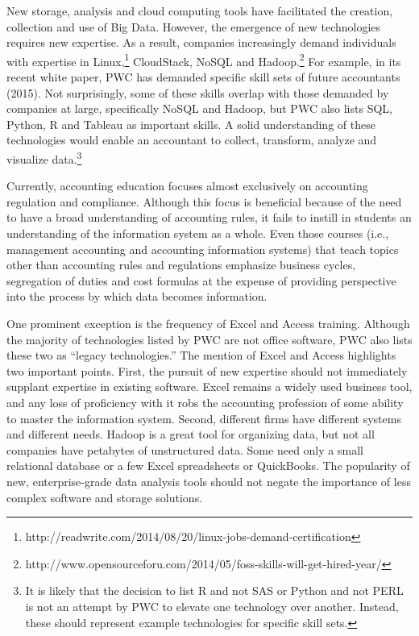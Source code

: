 \documentclass[12pt]{article}
\begin{document}
New storage, analysis and cloud computing tools have facilitated the creation, collection and use of Big Data. However, the emergence of new technologies requires new expertise. As a result, companies increasingly demand individuals with expertise in Linux,\footnote{http://readwrite.com/2014/08/20/linux-jobs-demand-certification} CloudStack, NoSQL and Hadoop.\footnote{http://www.opensourceforu.com/2014/05/foss-skills-will-get-hired-year/} For example, in its recent white paper, PWC has demanded specific skill sets of future accountants (2015). Not surprisingly, some of these skills overlap with those demanded by companies at large, specifically NoSQL and Hadoop, but PWC also lists SQL, Python, R and Tableau as important skills. A solid understanding of these technologies would enable an accountant to collect, transform, analyze and visualize data.\footnote{It is likely that the decision to list R and not SAS or Python and not PERL is not an attempt by PWC to elevate one technology over another. Instead, these should represent example technologies for specific skill sets.}

Currently, accounting education focuses almost exclusively on accounting regulation and compliance. Although this focus is beneficial because of the need to have a broad understanding of accounting rules, it fails to instill in students an understanding of the information system as a whole. Even those courses (i.e., management accounting and accounting information systems) that teach topics other than accounting rules and regulations emphasize business cycles, segregation of duties and cost formulas at the expense of providing perspective into the process by which data becomes information.

One prominent exception is the frequency of Excel and Access training. Although the majority of technologies listed by PWC are not office software, PWC also lists these two as ``legacy technologies.'' The mention of Excel and Access highlights two important points. First, the pursuit of new expertise should not immediately supplant expertise in existing software. Excel remains a widely used business tool, and any loss of proficiency with it robs the accounting profession of some ability to master the information system. Second, different firms have different systems and different needs. Hadoop is a great tool for organizing data, but not all companies have petabytes of unstructured data. Some need only a small relational database or a few Excel spreadsheets or QuickBooks. The popularity of new, enterprise-grade data analysis tools should not negate the importance of less complex software and storage solutions.
\end{document}
